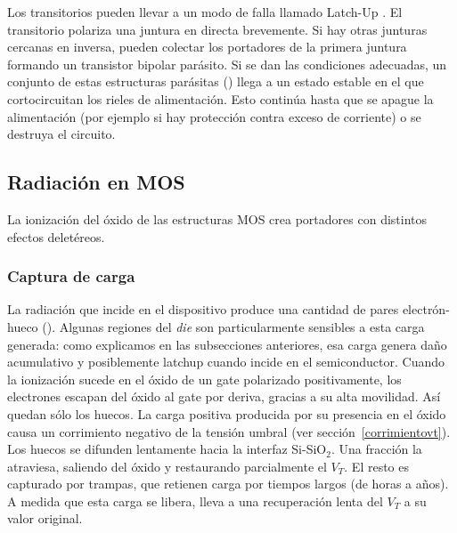 Los transitorios pueden llevar a un modo de falla llamado Latch-Up
\cite{gregory_latch-up_1973}.
El transitorio polariza una juntura en directa brevemente.
Si hay otras junturas cercanas en inversa,
pueden colectar los portadores de la primera juntura 
formando un transistor bipolar parásito.
Si se dan las condiciones adecuadas,
un conjunto de estas estructuras parásitas ()
llega a un estado estable
en el que cortocircuitan los rieles de alimentación.
Esto continúa hasta que se apague la alimentación 
(por ejemplo si hay protección contra exceso de corriente)
o se destruya el circuito.
\subsection{Radiación en MOS}
La ionización del óxido de las estructuras MOS crea portadores 
con distintos efectos deletéreos. 
\subsubsection{Captura de carga}
La radiación que incide en el dispositivo 
produce una cantidad de pares electrón-hueco ().
Algunas regiones del \emph{die}
son particularmente sensibles a esta carga generada:
como explicamos en las subsecciones anteriores,
esa carga genera daño acumulativo y posiblemente latchup 
cuando incide en el semiconductor.
Cuando la ionización sucede en el óxido de un gate polarizado positivamente,
los electrones escapan del óxido al gate por deriva,
gracias a su alta movilidad.
Así quedan sólo los huecos.
La carga positiva producida por su presencia en el óxido 
causa un corrimiento negativo de la tensión umbral 
(ver sección~\ref{corrimientovt}).
Los huecos se difunden lentamente hacia la interfaz Si-SiO$_2$.
Una fracción la atraviesa, 
saliendo del óxido y restaurando parcialmente el $V_T$.
El resto es capturado por trampas,
que retienen carga por tiempos largos (de horas a años).
A medida que esta carga se libera, 
lleva a una recuperación lenta del $V_T$ a su valor original.
